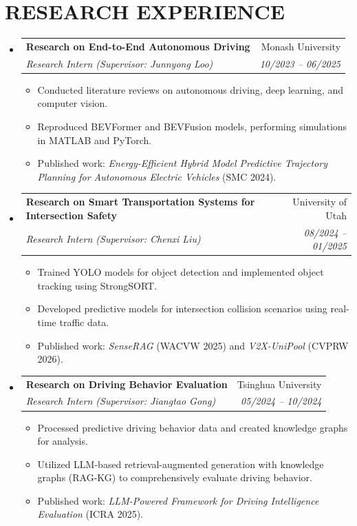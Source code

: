 \documentclass[letterpaper,11pt]{article}
\makeatletter
\newcommand{\resumeItem}[1]{
  \item\small{
    {#1 \vspace{-2pt}}
  }
}
\newcommand{\resumeSubheading}[4]{
  \vspace{-2pt}\item
    \begin{tabular*}{0.97\textwidth}[t]{l@{\extracolsep{\fill}}r}
      \textbf{#1} & #2 \\
      \textit{\small#3} & \textit{\small #4} \\
    \end{tabular*}\vspace{-7pt}
}
\newcommand{\resumeSubHeadingListStart}{\begin{itemize}[leftmargin=0.15in, label={}]}
\newcommand{\resumeSubHeadingListEnd}{\end{itemize}}
\newcommand{\resumeItemListStart}{\begin{itemize}}
\newcommand{\resumeItemListEnd}{\end{itemize}\vspace{-5pt}}
\makeatother
\begin{document}
\vspace{10pt}

\section{\textbf{RESEARCH EXPERIENCE}}
  \resumeSubHeadingListStart
    \resumeSubheading
      {Research on End-to-End Autonomous Driving}{Monash University}
      {Research Intern (Supervisor: Junnyong Loo)}{10/2023 -- 06/2025}
      \resumeItemListStart
      \resumeItem{Conducted literature reviews on autonomous driving, deep learning, and computer vision.}
      \resumeItem{Reproduced BEVFormer and BEVFusion models, performing simulations in MATLAB and PyTorch.}
      \resumeItem{Published work: \textit{Energy-Efficient Hybrid Model Predictive Trajectory Planning for Autonomous Electric Vehicles} (SMC 2024).}
      \resumeItemListEnd

    \resumeSubheading
      {Research on Smart Transportation Systems for Intersection Safety}{University of Utah}
      {Research Intern (Supervisor: Chenxi Liu)}{08/2024 -- 01/2025}
      \resumeItemListStart
      \resumeItem{Trained YOLO models for object detection and implemented object tracking using StrongSORT.}
      \resumeItem{Developed predictive models for intersection collision scenarios using real-time traffic data.}
      \resumeItem{Published work: \textit{SenseRAG} (WACVW 2025) and \textit{V2X-UniPool} (CVPRW 2026).}
      \resumeItemListEnd

    \resumeSubheading
      {Research on Driving Behavior Evaluation}{Tsinghua University}
      {Research Intern (Supervisor: Jiangtao Gong)}{05/2024 -- 10/2024}
      \resumeItemListStart
      \resumeItem{Processed predictive driving behavior data and created knowledge graphs for analysis.}
      \resumeItem{Utilized LLM-based retrieval-augmented generation with knowledge graphs (RAG-KG) to comprehensively evaluate driving behavior.}
      \resumeItem{Published work: \textit{LLM-Powered Framework for Driving Intelligence Evaluation} (ICRA 2025).}
      \resumeItemListEnd
  \resumeSubHeadingListEnd


\vspace{5pt}

\end{document}
